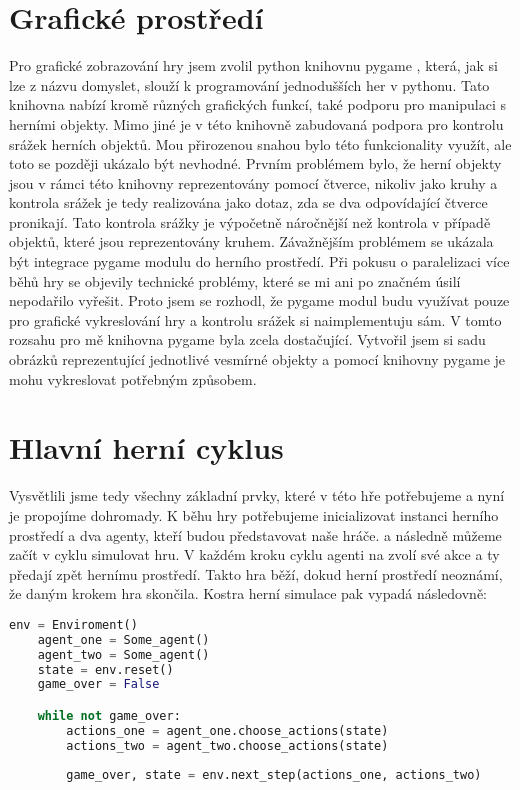 \section{Grafické prostředí}
Pro grafické zobrazování hry jsem zvolil python knihovnu pygame \cite{pygame}, která, jak si lze z názvu domyslet, slouží k programování jednodušších her v pythonu.
Tato knihovna nabízí kromě různých grafických funkcí, také podporu pro manipulaci s herními objekty. Mimo jiné je v této knihovně zabudovaná podpora pro kontrolu srážek herních objektů.
Mou přirozenou snahou bylo této funkcionality využít, ale toto se později ukázalo být nevhodné.
Prvním problémem bylo, že herní objekty jsou v rámci této knihovny reprezentovány pomocí čtverce, nikoliv jako kruhy a kontrola srážek je tedy realizována jako dotaz, zda se dva odpovídající čtverce pronikají.
Tato kontrola srážky je výpočetně náročnější než kontrola v případě objektů, které jsou reprezentovány kruhem.  
Závažnějším problémem se ukázala být integrace pygame modulu do herního prostředí. Při pokusu o paralelizaci více běhů hry se objevily technické problémy, které se mi ani po značném úsilí nepodařilo vyřešit.
Proto jsem se rozhodl, že pygame modul budu využívat pouze pro grafické vykreslování hry a kontrolu srážek si naimplementuju sám.
V tomto rozsahu pro mě knihovna pygame byla zcela dostačující. Vytvořil jsem si sadu obrázků reprezentující jednotlivé vesmírné objekty a pomocí knihovny pygame je mohu vykreslovat potřebným způsobem.


\section{Hlavní herní cyklus}
Vysvětlili jsme tedy všechny základní prvky, které v této hře potřebujeme a nyní je propojíme dohromady.
K běhu hry potřebujeme inicializovat instanci herního prostředí a dva agenty, kteří budou představovat naše hráče.
a následně můžeme začít v cyklu simulovat hru.
V každém kroku cyklu agenti na zvolí své akce a ty předají zpět hernímu prostředí.
Takto hra běží, dokud herní prostředí neoznámí, že daným krokem hra skončila.
Kostra herní simulace pak vypadá následovně:

\begin{lstlisting}[language=Python]
    env = Enviroment()
    agent_one = Some_agent()
    agent_two = Some_agent()    
    state = env.reset()
    game_over = False

    while not game_over:
        actions_one = agent_one.choose_actions(state)    
        actions_two = agent_two.choose_actions(state)
        
        game_over, state = env.next_step(actions_one, actions_two)
\end{lstlisting}
